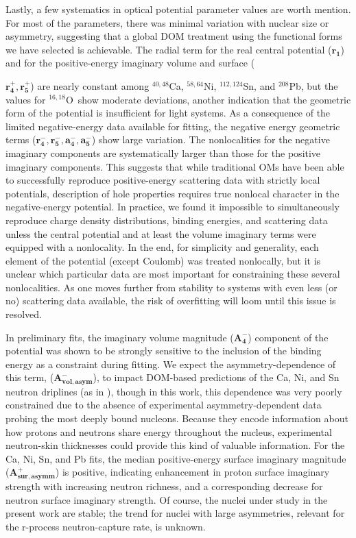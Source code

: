 \documentclass[twocolumn,secnumarabic,amssymb, nobibnotes, aps, prl,
superscriptaddress, nobalancelastpage, floatfix]{revtex4}
\newcommand{\oSixEight}{\ensuremath{^{16,18}}O}
\newcommand{\caAughtEight}{\ensuremath{^{40,48}}C\lowercase{a}}
\newcommand{\niEightFour}{\ensuremath{^{58,64}}N\lowercase{i}}
\newcommand{\snTwelveFour}{\ensuremath{^{112,124}}S\lowercase{n}}
\newcommand{\pbEight}{\ensuremath{^{208}}P\lowercase{b}}
\begin{document}
Lastly, a few systematics in optical potential parameter values are worth mention.
For most of the parameters, there was minimal variation with nuclear size or asymmetry, 
suggesting that a global DOM treatment using the functional forms we have
selected is achievable. The radial term for the real central potential
($\mathbf{r_{1}}$) and for the positive-energy imaginary volume and surface ({$\mathbf{r_{4}^{+},
r_{5}^{+}}$) are nearly constant among \caAughtEight, \niEightFour, \snTwelveFour, and \pbEight, but the values for
\oSixEight\ show moderate deviations, another indication that the geometric form of the
potential is insufficient for light systems. As a consequence of the limited negative-energy data
available for fitting, the negative energy geometric terms ($\mathbf{r_{4}^{-}, r_{5}^{-}, a_{4}^{-},
a_{5}^{-}}$) show large variation. The nonlocalities for the negative imaginary components
are systematically larger than those for the positive imaginary components. This suggests that while
traditional OMs have been able to successfully reproduce positive-energy scattering data
with strictly local potentials, description of hole properties requires 
true nonlocal character in the negative-energy potential. In practice, we found it impossible to 
simultaneously reproduce charge density distributions, binding energies, and scattering data 
unless the central potential and at least the volume imaginary terms were equipped
with a nonlocality. In the end, for simplicity and generality, each element of the
potential (except Coulomb) was treated nonlocally, but it is unclear which particular data
are most important for constraining these several nonlocalities. As one moves further from stability
to systems with even less (or no) scattering data available, the risk of
overfitting will loom until this issue is resolved.

In preliminary fits, the imaginary volume magnitude ($\mathbf{A_{4}^{-}}$)
component of the potential was shown to be strongly sensitive to the inclusion of the binding 
energy as a constraint during fitting. We expect the asymmetry-dependence of this term,
($\mathbf{A_{vol,asym}^{-}}$), to impact DOM-based predictions
of the Ca, Ni, and Sn neutron driplines (as in \cite{Mueller2011}), though in this work, this dependence was very poorly
constrained due to the absence of experimental asymmetry-dependent data probing the most deeply
bound nucleons. Because they encode information about how protons and neutrons
share energy throughout the nucleus, experimental neutron-skin thicknesses could
provide this kind of valuable information. For the Ca, Ni, Sn, and Pb fits,
the median positive-energy surface imaginary magnitude
($\mathbf{A_{sur,asymm}^{+}}$) is positive, indicating enhancement in proton surface imaginary
strength with increasing neutron richness, and a corresponding decrease for neutron surface
imaginary strength. Of course, the nuclei under study in the present work are stable; the trend
for nuclei with large asymmetries, relevant for the r-process neutron-capture rate, is unknown.

}
\end{document}
